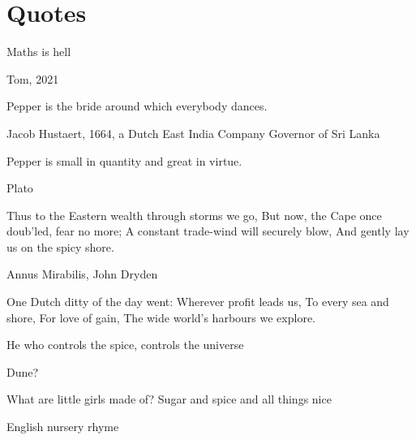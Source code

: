 \chapter{Quotes}

\epigraph{Maths is hell}{Tom, 2021}

\epigraph{Pepper is the bride around which everybody dances.}{Jacob Hustaert, 1664, a Dutch East India Company Governor of Sri Lanka}

\epigraph{Pepper is small in quantity and great in virtue.}{Plato}

\epigraph{Thus to the Eastern wealth through storms we go, 
But now, the Cape once doub’led, fear no more;
A constant trade-wind will securely blow,
And gently lay us on the spicy shore.}{Annus Mirabilis, John Dryden}

One Dutch ditty of the day went:
Wherever profit leads us,
To every sea and shore,
For love of gain,
The wide world’s harbours we explore.


\epigraph{He who controls the spice, controls the universe}{Dune?}

\epigraph{What are little girls made of? Sugar and spice and all things nice}{English nursery rhyme}